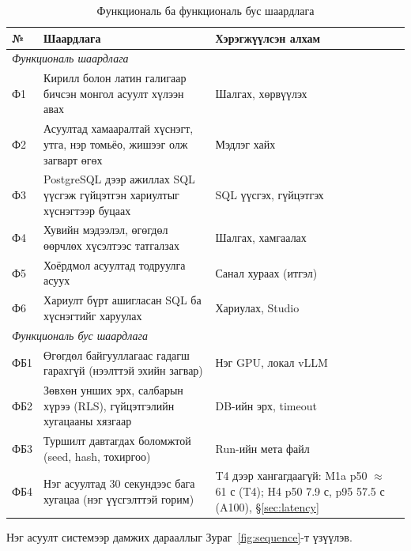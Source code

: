 \begin{table}[H]
\centering\small
\caption{Функциональ ба функциональ бус шаардлага}
\label{tab:req}
\begin{tabularx}{\textwidth}{p{1.0cm}X p{3.6cm}}
\toprule
№ & Шаардлага & Хэрэгжүүлсэн алхам \\
\midrule
\multicolumn{3}{l}{\textit{Функциональ шаардлага}} \\
Ф1 & Кирилл болон латин галигаар бичсэн монгол асуулт хүлээн авах & Шалгах, хөрвүүлэх \\
Ф2 & Асуултад хамааралтай хүснэгт, утга, нэр томьёо, жишээг олж загварт өгөх & Мэдлэг хайх \\
Ф3 & PostgreSQL дээр ажиллах SQL үүсгэж гүйцэтгэн хариултыг хүснэгтээр буцаах & SQL үүсгэх, гүйцэтгэх \\
Ф4 & Хувийн мэдээлэл, өгөгдөл өөрчлөх хүсэлтээс татгалзах & Шалгах, хамгаалах \\
Ф5 & Хоёрдмол асуултад тодруулга асуух & Санал хураах (итгэл) \\
Ф6 & Хариулт бүрт ашигласан SQL ба хүснэгтийг харуулах & Хариулах, Studio \\
\multicolumn{3}{l}{\textit{Функциональ бус шаардлага}} \\
ФБ1 & Өгөгдөл байгууллагаас гадагш гарахгүй (нээлттэй эхийн загвар) & Нэг GPU, локал vLLM \\
ФБ2 & Зөвхөн унших эрх, салбарын хүрээ (RLS), гүйцэтгэлийн хугацааны хязгаар & DB-ийн эрх, timeout \\
ФБ3 & Туршилт давтагдах боломжтой (seed, hash, тохиргоо) & Run-ийн мета файл \\
ФБ4 & Нэг асуултад 30 секундээс бага хугацаа (нэг үүсгэлттэй горим) & T4 дээр хангагдаагүй: M1a p50 $\approx$ 61 с (T4); H4 p50 7.9 с, p95 57.5 с (A100), §\ref{sec:latency} \\
\bottomrule
\end{tabularx}
\end{table}

Нэг асуулт системээр дамжих дарааллыг Зураг~\ref{fig:sequence}-т үзүүлэв.

